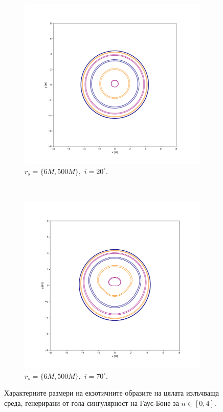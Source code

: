 \begin{figure}[!htb]
	\centering
	\begin{subfigure}{6cm}
		\includegraphics[scale = 0.25]{GB_20_deg_r6_500_gamma_1.15.png}
		\caption{$r_s = \{6M, 500M\},\,\, i = 20^\circ$.}
	\end{subfigure}\,\,\,
	\begin{subfigure}{6cm}
		\includegraphics[scale = 0.25]{GB_70_deg_r6_500_gamma_1.15.png}
		\caption{$r_s = \{6M, 500M\},\,\, i = 70^\circ$.}
	\end{subfigure}
	\caption[Характерните размери на екзотичните образите на цялата излъчваща среда, генерирани от гола сингулярност на Гаус-Боне.]{\small Характерните размери на екзотичните образите на цялата излъчваща среда, генерирани от гола сингулярност на Гаус-Боне за $n\in[0, 4]$.} 
	\label{GB_img_size_deg}
\end{figure}

